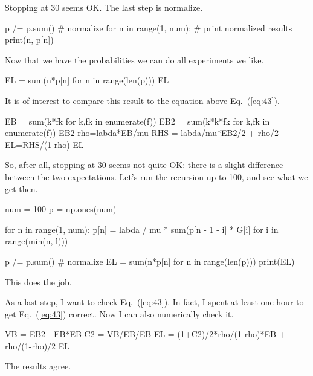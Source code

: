 \begin{exercise}[\faCalculator]
\begin{solution}
\begin{pyconsole}
\end{pyconsole}
Stopping at 30 seems OK. The last step is normalize.
\begin{pyconsole}
p /= p.sum()  # normalize
for n in range(1, num):  # print normalized results
    print(n, p[n])

\end{pyconsole}

Now that we have the probabilities we can do all experiments we like. 
\begin{pyconsole}
EL = sum(n*p[n] for n in range(len(p)))
EL 
\end{pyconsole}

It is of interest to compare this result to the equation above
Eq.~(\ref{eq:43}).


\begin{pyconsole}
EB = sum(k*fk for k,fk in enumerate(f))
EB2 = sum(k*k*fk for k,fk in enumerate(f))
EB2
rho=labda*EB/mu
RHS = labda/mu*EB2/2 + rho/2
EL=RHS/(1-rho)
EL
\end{pyconsole}

So, after all, stopping at 30 seems not quite OK: there is a slight
difference between the two expectations. Let's run the recursion up to
100, and see what we get then.

\begin{pyconsole}
num = 100
p = np.ones(num)

for n in range(1, num):
    p[n] = labda / mu * sum(p[n - 1 - i] * G[i] for i in range(min(n, l)))

p /= p.sum()  # normalize
EL = sum(n*p[n] for n in range(len(p)))
print(EL)
\end{pyconsole}
This does the job.

As a last step, I want to check Eq.~(\ref{eq:43}). In fact, I spent at least one hour to
get Eq.~(\ref{eq:43}) correct. Now I can also numerically check it.

\begin{pyconsole}
VB = EB2 - EB*EB
C2 = VB/EB/EB
EL = (1+C2)/2*rho/(1-rho)*EB + rho/(1-rho)/2
EL
\end{pyconsole}
The results agree. 
\end{solution}
\end{exercise}


